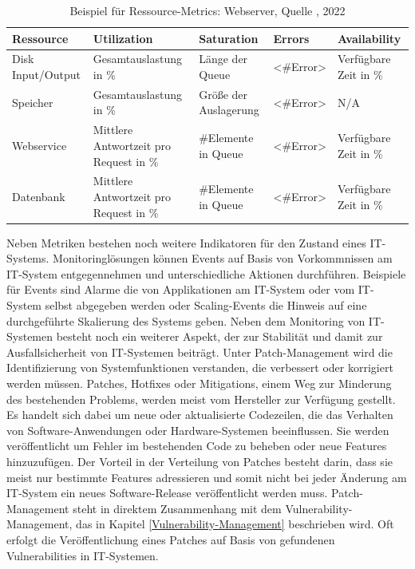 \begin{table}[H]
    \centering
    \caption{Beispiel für Ressource-Metrics: Webserver, Quelle \textcite{le-quoc_2015}, 2022} 
    \tiny
        \begin{tabular}{lllll}
            \hline
            Ressource & Utilization & Saturation & Errors & Availability\\
            \hline\hline
            Disk Input/Output & Gesamtauslastung in \% & Länge der Queue & <\#Error> & Verfügbare Zeit in \% \\
            Speicher & Gesamtauslastung in \% & Größe der Auslagerung & <\#Error> & N/A \\
            Webservice & Mittlere Antwortzeit pro Request in \% & \#Elemente in Queue & <\#Error> & Verfügbare Zeit in \% \\
            Datenbank & Mittlere Antwortzeit pro Request in \% & \#Elemente in Queue & <\#Error> & Verfügbare Zeit in \% \\
        \end{tabular}
        \label{table:RM-Beispiele}
\end{table}
\bigbreak
Neben Metriken bestehen noch weitere Indikatoren für den Zustand eines IT-Systems. Monitoringlösungen können \glqq{}Events\grqq{} auf Basis von Vorkommnissen am IT-System entgegennehmen und unterschiedliche Aktionen durchführen. Beispiele für Events sind \glqq{}Alarme\grqq{} die von Applikationen am IT-System oder vom IT-System selbst abgegeben werden oder \glqq{}Scaling-Events\grqq{} die Hinweis auf eine durchgeführte Skalierung des Systems geben. 
\bigbreak
Neben dem Monitoring von IT-Systemen besteht noch ein weiterer Aspekt, der zur Stabilität und damit zur Ausfallsicherheit von IT-Systemen beiträgt. Unter \glqq{}Patch-Management\grqq{} wird die Identifizierung von Systemfunktionen verstanden, die verbessert oder korrigiert werden müssen. Patches, Hotfixes oder Mitigations, einem Weg zur Minderung des bestehenden Problems, werden meist vom Hersteller zur Verfügung gestellt. Es handelt sich dabei um neue oder aktualisierte Codezeilen, die das Verhalten von Software-Anwendungen oder Hardware-Systemen beeinflussen. Sie werden veröffentlicht um Fehler im bestehenden Code zu beheben oder neue Features hinzuzufügen. Der Vorteil in der Verteilung von Patches besteht darin, dass sie meist nur bestimmte Features adressieren und somit nicht bei jeder Änderung am IT-System ein neues Software-Release veröffentlicht werden muss. Patch-Management steht in direktem Zusammenhang mit dem \glqq{}Vulnerability-Management\grqq{}, das in Kapitel \ref{Vulnerability-Management} beschrieben wird. Oft erfolgt die Veröffentlichung eines Patches auf Basis von gefundenen Vulnerabilities in IT-Systemen. \autocite{redhat}
